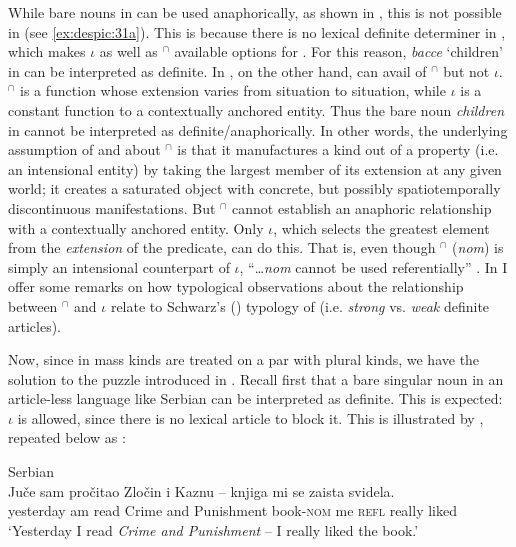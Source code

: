 \documentclass[output=paper,
modfonts
]{langscibook}
\begin{document}
	While bare nouns in  can be used anaphorically, as shown in , this is not possible in  (see \ref{ex:despic:31a}). This is because there is no lexical definite determiner in , which makes $\iota$ as well as $^\cap$ available options for . For this reason, \textit{bacce} `children' in  can be interpreted as definite. In , on the other hand,  can avail of $^\cap$ but not $\iota$. $^\cap$ is a function whose extension varies from situation to situation, while $\iota$ is a constant function to a
	contextually anchored entity. Thus the bare noun \textit{children} in  cannot be interpreted as definite/anaphorically.
	In other words, the underlying assumption of \citet{Chierchia1998} and \citet{Dayal2004} about $^\cap$ is that it manufactures a kind out of a property (i.e. an intensional entity) by taking the largest member of its extension at any given world; it creates a saturated object with concrete, but possibly spatiotemporally discontinuous manifestations. But $^\cap$ cannot establish an anaphoric relationship with a contextually anchored entity. Only $\iota$, which selects the greatest element from the \textit{extension} of the predicate, can do this. That is, even though $^\cap$ (\textit{nom}) is simply an intensional counterpart of $\iota$, ``\ldots \textit{nom} cannot be used referentially'' \citep[1103]{Dayal2011}. In  I offer some remarks on how  typological observations about the relationship between $^\cap$ and $\iota$ relate to Schwarz's (\citeyear{Schwarz2009,Schwarz2013}) typology of  (i.e. \textit{strong} vs. \textit{weak} definite articles). 
	
	Now, since in \citet{Dayal2004} mass kinds are treated on a par with plural kinds, we have the solution to the puzzle introduced in . Recall first that a bare singular noun in an article-less language like Serbian can be interpreted as definite. This is expected: $\iota$ is allowed, since there is no lexical article to block it. This is illustrated by , repeated below as :
	
	\ea \label{ex:despic:32}
	Serbian \\
	\gll 
	{Ju\v ce} {sam} {pro\v citao} {{Zlo\v cin i Kaznu}} {--} {knjiga} {mi} {se} {zaista} {svidela.} \\
	yesterday am read {Crime and Punishment} {} book-\textsc{nom} me \textsc{refl} really liked \\ 
	\glt `Yesterday I read \textit{Crime and Punishment} -- I really liked the book.'
	\z 
	
\end{document}
